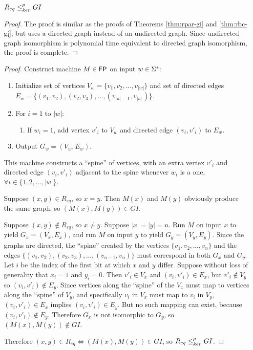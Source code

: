 \begin{theorem}\label{thm:req_kr_gi}$R_{eq} \leq^{p}_{ker} GI$\end{theorem}
\begin{proof}The proof is similar as the proofs of Theorems \ref{thm:rpar-gi}
  and \ref{thm:rbc-gi}, but uses a directed graph instead of an undirected
  graph. Since undirected graph isomorphism is polynomial time equivalent to
  directed graph isomorphism, the proof is complete.\end{proof}
\begin{proof}
  Construct machine $M\in{\ensuremath{\mathsf{FP}}}$ on input $w\in\Sigma^{*}$:
  \begin{enumerate}
  \item Initialize set of vertices $V_w=\{v_1, v_2, \ldots, v_{|w|}\}$
    and set of directed edges $E_w=\{(v_1, v_2),(v_2,
    v_3),\ldots,(v_{|w|-1}, v_{|w|})\}$.
  \item For $i=1$ to $|w|$:
    \begin{enumerate}
    \item If $w_i=1$, add vertex $v'_i$ to $V_w$ and directed edge $(v_i,
      v'_i)$ to $E_w$.
    \end{enumerate}
  \item Output $G_w=(V_w, E_w)$.
  \end{enumerate}
  This machine constructs a ``spine'' of vertices, with an extra vertex $v'_i$
  and directed edge $(v_i, v'_i)$ adjacent to the spine whenever $w_i$ is a
  one, $\forall i\in\{1,2,\ldots,|w|\}$.

  Suppose $(x, y)\in R_{eq}$, so $x=y$. Then $M(x)$ and $M(y)$ obviously
  produce the same graph, so $(M(x), M(y))\in GI$.
  

  Suppose $(x, y)\notin R_{eq}$, so $x\neq y$. Suppose $|x|=|y|=n$. Run $M$ on
  input $x$ to yield $G_x=(V_x, E_x)$, and run $M$ on input $y$ to yield
  $G_y=(V_y, E_y)$. Since the graphs are directed, the ``spine'' created by the
  vertices $\{v_1, v_2, \ldots, v_n\}$ and the edges $\{(v_1, v_2), (v_2, v_3),
  \ldots, (v_{n-1}, v_n)\}$ must correspond in both $G_x$ and $G_y$. Let $i$ be
  the index of the first bit at which $x$ and $y$ differ. Suppose without loss
  of generality that $x_i=1$ and $y_i=0$. Then $v'_i\in V_x$ and $(v_i,
  v'_i)\in E_x$, but $v'_i\notin V_y$ so $(v_i, v'_i)\notin E_y$. Since
  vertices along the ``spine'' of the $V_x$ must map to vertices along the
  ``spine'' of $V_y$, and specifically $v_i$ in $V_x$ must map to $v_i$ in
  $V_y$, $(v_i, v'_i)\in E_x$ implies $(v_i, v'_i)\in E_y$. But no such mapping
  can exist, because $(v_i, v'_i)\notin E_y$. Therefore $G_x$ is not isomorphic
  to $G_y$, so $(M(x), M(y))\notin GI$.

  Therefore $(x, y)\in R_{eq} \iff (M(x), M(y))\in GI$, so $R_{eq}\leq^{p}_{ker} GI$.  
\end{proof}

